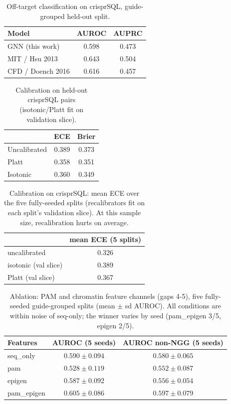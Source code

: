 \begin{table}[h]\centering\caption{Off-target classification on crisprSQL, guide-grouped held-out split.}\label{tab:offtarget}\begin{tabular}{lcc}\hline Model & AUROC & AUPRC \\\hline
GNN (this work) & 0.598 & 0.473 \\
MIT / Hsu 2013 & 0.643 & 0.504 \\
CFD / Doench 2016 & 0.616 & 0.457 \\
\hline\end{tabular}\end{table}
\begin{table}[h]\centering\caption{Calibration on held-out crisprSQL pairs (isotonic/Platt fit on validation slice).}\label{tab:calib}\begin{tabular}{lcc}\hline & ECE & Brier \\\hline
Uncalibrated & 0.389 & 0.373 \\
Platt & 0.358 & 0.351 \\
Isotonic & 0.360 & 0.349 \\
\hline\end{tabular}\end{table}
\begin{table}[h]\centering\caption{Calibration on crisprSQL: mean ECE over the five fully-seeded splits (recalibrators fit on each split's validation slice). At this sample size, recalibration hurts on average.}\label{tab:calib}\begin{tabular}{lc}\hline & mean ECE (5 splits) \\\hline
uncalibrated & 0.326 \\
isotonic (val slice) & 0.389 \\
Platt (val slice) & 0.367 \\
\hline\end{tabular}\end{table}
\begin{table}[h]\centering\caption{Ablation: PAM and chromatin feature channels (gaps 4-5), five fully-seeded guide-grouped splits (mean $\pm$ sd AUROC). All conditions are within noise of seq-only; the winner varies by seed (pam\_epigen 3/5, epigen 2/5).}\label{tab:ablation}\begin{tabular}{lcc}\hline Features & AUROC (5 seeds) & AUROC non-NGG (5 seeds) \\\hline
seq\_only & $0.590 \pm 0.094$ & $0.580 \pm 0.065$ \\
pam & $0.528 \pm 0.119$ & $0.552 \pm 0.087$ \\
epigen & $0.587 \pm 0.092$ & $0.556 \pm 0.054$ \\
pam\_epigen & $0.605 \pm 0.086$ & $0.597 \pm 0.079$ \\
\hline\end{tabular}\end{table}

